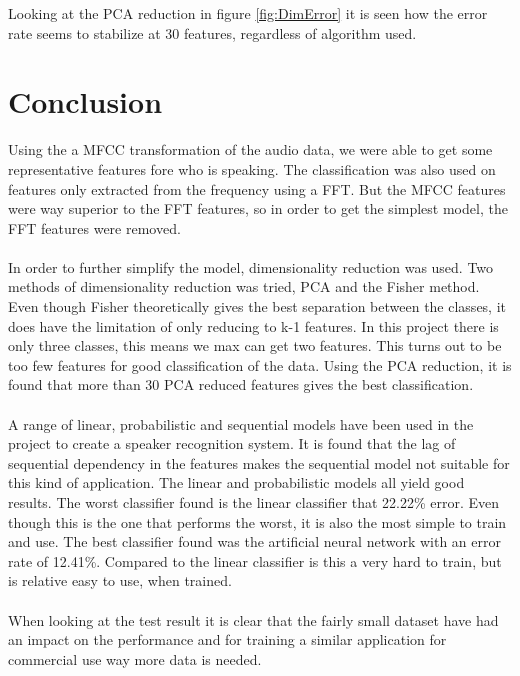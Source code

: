 Looking at the PCA reduction in figure \ref{fig:DimError} it is seen how the error rate seems to stabilize at 30 features, regardless of algorithm used.


\section{Conclusion}
Using the a MFCC transformation of the audio data, we were able to get some representative features fore who is speaking. The classification was also used on features only extracted from the frequency using a FFT. But the MFCC features were way superior to the FFT features, so in order to get the simplest model, the FFT features were removed. \\\ \\

In order to further simplify the model, dimensionality reduction was used. Two methods of dimensionality reduction was tried, PCA and the Fisher method. Even though Fisher theoretically gives the best separation between the classes, it does have the limitation of only reducing to k-1 features. In this project there is only three classes, this means we max can get two features. This turns out to be too few features for good classification of the data. Using the PCA reduction, it is found that more than 30 PCA reduced features gives the best classification.  \\\ \\ 

A range of linear, probabilistic and sequential models have been used in the project to create a speaker recognition system. It is found that the lag of sequential dependency in the features makes the sequential model not suitable for this kind of application. The linear and probabilistic models all yield good results. The worst classifier found is the linear classifier that 22.22\% error. Even though this is the one that performs the worst, it is also the most simple to train and use. The best classifier found was the artificial neural network with an error rate of 12.41\%. Compared to the linear classifier is this a very hard to train, but is relative easy to use, when trained. \\\ \\  

When looking at the test result it is clear that the fairly small dataset have had an impact on the performance and for training a similar application for commercial use way more data is needed. 
